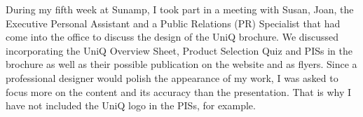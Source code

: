 During my fifth week at Sunamp, I took part in a meeting with Susan, Joan, the Executive Personal Assistant
and a Public Relations (PR) Specialist that had come into the office to discuss the design of the UniQ brochure.
We discussed incorporating the UniQ Overview Sheet, Product Selection Quiz and PISs in the brochure as well as their possible publication on the website and as flyers.
Since a professional designer would polish the appearance of my work, I was asked to focus more on the content and its accuracy than the presentation.
That is why I have not included the UniQ logo in the PISs, for example.

